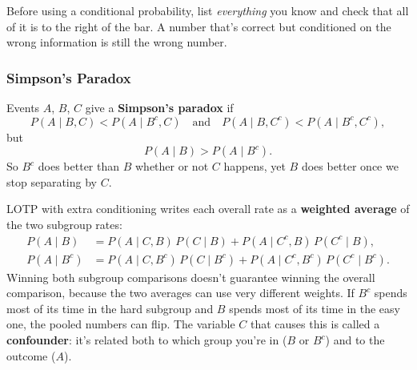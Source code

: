 \begin{pitfall}
Before using a conditional probability, list \emph{everything} you know and check that all of it is to the right of the bar. A number that's correct but conditioned on the wrong information is still the wrong number.
\end{pitfall}

\subsubsection{Simpson's Paradox}

\begin{definition}\label{def:simpson}
Events $A$, $B$, $C$ give a \textbf{Simpson's paradox} if
\[
P(A \mid B, C) < P(A \mid B^c, C)
\quad \text{and} \quad
P(A \mid B, C^c) < P(A \mid B^c, C^c),
\]
but
\[
P(A \mid B) > P(A \mid B^c).
\]
So $B^c$ does better than $B$ whether or not $C$ happens, yet $B$ does better once we stop separating by $C$.
\end{definition}

\begin{intuition}
LOTP with extra conditioning writes each overall rate as a \textbf{weighted average} of the two subgroup rates:
\begin{align*}
P(A \mid B)   &= P(A \mid C, B)\,P(C \mid B) + P(A \mid C^c, B)\,P(C^c \mid B), \\[0.3em]
P(A \mid B^c) &= P(A \mid C, B^c)\,P(C \mid B^c) + P(A \mid C^c, B^c)\,P(C^c \mid B^c).
\end{align*}
Winning both subgroup comparisons doesn't guarantee winning the overall comparison, because the two averages can use very different weights. If $B^c$ spends most of its time in the hard subgroup and $B$ spends most of its time in the easy one, the pooled numbers can flip. The variable $C$ that causes this is called a \textbf{confounder}: it's related both to which group you're in ($B$ or $B^c$) and to the outcome ($A$).
\end{intuition}

